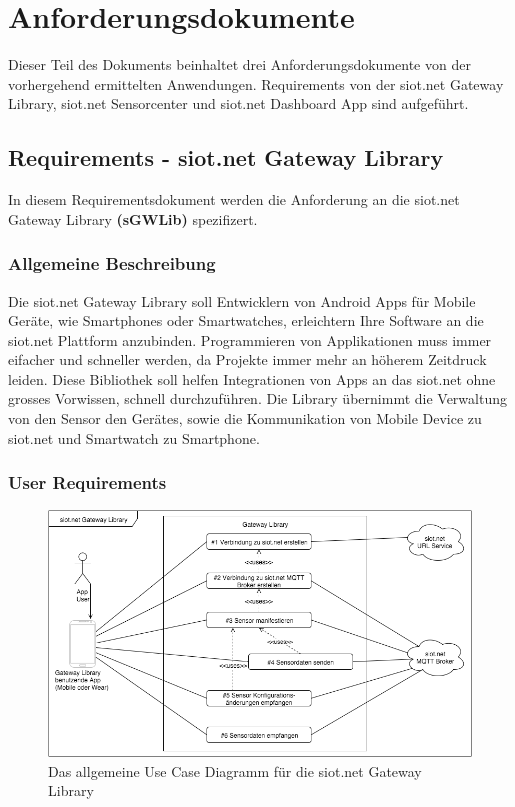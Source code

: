 \chapter{Anforderungsdokumente}
Dieser Teil des Dokuments beinhaltet drei Anforderungsdokumente von der vorhergehend ermittelten Anwendungen.
Requirements von der siot.net Gateway Library, siot.net Sensorcenter und siot.net Dashboard App sind aufgeführt.
\section{Requirements - siot.net Gateway Library}
In diesem Requirementsdokument werden die Anforderung an die siot.net Gateway Library \textbf{(sGWLib)} spezifizert.
\subsection{Allgemeine Beschreibung}
Die siot.net Gateway Library soll Entwicklern von Android Apps für Mobile Geräte, wie Smartphones oder Smartwatches, erleichtern Ihre Software an die siot.net Plattform anzubinden.
Programmieren von Applikationen muss immer eifacher und schneller werden, da Projekte immer mehr an höherem Zeitdruck leiden. Diese Bibliothek soll helfen Integrationen von Apps an das siot.net ohne grosses Vorwissen, schnell durchzuführen.
Die Library übernimmt die Verwaltung von den Sensor den Gerätes, sowie die Kommunikation von Mobile Device zu siot.net und Smartwatch zu Smartphone.
\subsection{User Requirements}
\begin{figure}[h]
  \centering
  \includegraphics[scale=0.6]{98_Bilder/08_Requirements/UseCaseGatewayLibrary}
  \caption[Use Case siot.net Gateway Library]{Das allgemeine Use Case Diagramm für die siot.net Gateway Library}
\end{figure}

